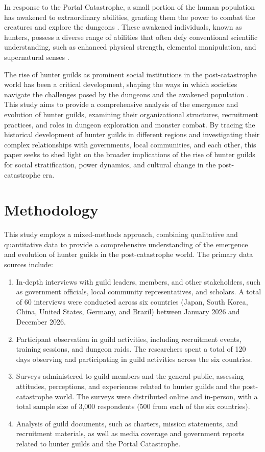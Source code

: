 \documentclass[12pt]{article}
\begin{document}
In response to the Portal Catastrophe, a small portion of the human population has awakened to extraordinary abilities, granting them the power to combat the creatures and explore the dungeons \cite{Oliveira2027}. These awakened individuals, known as hunters, possess a diverse range of abilities that often defy conventional scientific understanding, such as enhanced physical strength, elemental manipulation, and supernatural senses \cite{Gao2026}. 

The rise of hunter guilds as prominent social institutions in the post-catastrophe world has been a critical development, shaping the ways in which societies navigate the challenges posed by the dungeons and the awakened population \cite{Nguyen2026}. This study aims to provide a comprehensive analysis of the emergence and evolution of hunter guilds, examining their organizational structures, recruitment practices, and roles in dungeon exploration and monster combat. By tracing the historical development of hunter guilds in different regions and investigating their complex relationships with governments, local communities, and each other, this paper seeks to shed light on the broader implications of the rise of hunter guilds for social stratification, power dynamics, and cultural change in the post-catastrophe era.

\section{Methodology}
This study employs a mixed-methods approach, combining qualitative and quantitative data to provide a comprehensive understanding of the emergence and evolution of hunter guilds in the post-catastrophe world. The primary data sources include:

\begin{enumerate}
\item In-depth interviews with guild leaders, members, and other stakeholders, such as government officials, local community representatives, and scholars. A total of 60 interviews were conducted across six countries (Japan, South Korea, China, United States, Germany, and Brazil) between January 2026 and December 2026.

\item Participant observation in guild activities, including recruitment events, training sessions, and dungeon raids. The researchers spent a total of 120 days observing and participating in guild activities across the six countries.

\item Surveys administered to guild members and the general public, assessing attitudes, perceptions, and experiences related to hunter guilds and the post-catastrophe world. The surveys were distributed online and in-person, with a total sample size of 3,000 respondents (500 from each of the six countries).

\item Analysis of guild documents, such as charters, mission statements, and recruitment materials, as well as media coverage and government reports related to hunter guilds and the Portal Catastrophe.
\end{enumerate}
\end{document}
